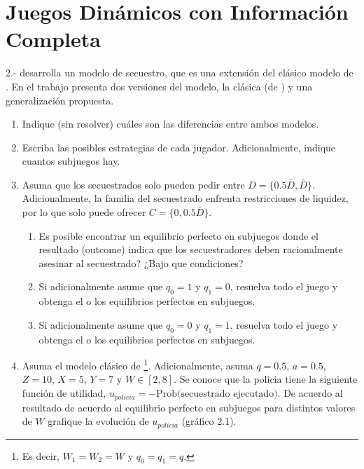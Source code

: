 \documentclass[11pt]{article}
\begin{document}
\section*{Juegos Din\'amicos con Informaci\'on Completa}

2.- \cite{iqbal2017kidnapping} desarrolla un modelo de secuestro, que es una extensi\'on del cl\'asico modelo de \cite{selten1977simple}. En el trabajo presenta dos versiones del modelo, la cl\'asica (de \cite{selten1977simple}) y una generalizaci\'on propuesta.
\begin{enumerate}
	\item Indique (sin resolver) cu\'ales son las diferencias entre ambos modelos.

	\item Escriba las posibles estrategias de cada jugador. Adicionalmente, indique cuantos subjuegos hay.

	\item Asuma que los secuestrados solo pueden pedir entre $D = \{0.5\bar{D}, \bar{D}\}$. Adicionalmente, la familia del secuestrado enfrenta restricciones de liquidez, por lo que solo puede ofrecer $C = \{0, 0.5\bar{D}\}$. 
	\begin{enumerate}
		\item Es posible encontrar un equilibrio perfecto en subjuegos donde el resultado (outcome) indica que los secuestradores deben racionalmente asesinar al secuestrado? ¿Bajo que condiciones?
		\item Si adicionalmente asume que $q_{0} = 1$ y $q_{1} = 0$, resuelva todo el juego y obtenga el o los equilibrios perfectos en subjuegos.
		\item Si adicionalmente asume que $q_{0} = 0$ y $q_{1} = 1$, resuelva todo el juego y obtenga el o los equilibrios perfectos en subjuegos.
	\end{enumerate}

	\item Asuma el modelo cl\'asico de \cite{selten1977simple}\footnote{Es decir, $W_{1} = W_{2} = W$ y $q_{0} = q_{1} = q$.}. Adicionalmente, asuma $q=0.5$, $a = 0.5$, $Z = 10$, $X = 5$, $Y = 7$ y $W \in [2,8]$. Se conoce que la policia tiene la siguiente funci\'on de utilidad, $u_{policia} = -\text{Prob(secuestrado ejecutado)}$. De acuerdo al resultado de acuerdo al equilibrio perfecto en subjuegos para distintos valores de $W$ grafique la evoluci\'on de $u_{policia}$ (gr\'afico 2.1).
\end{enumerate}
\end{document}

